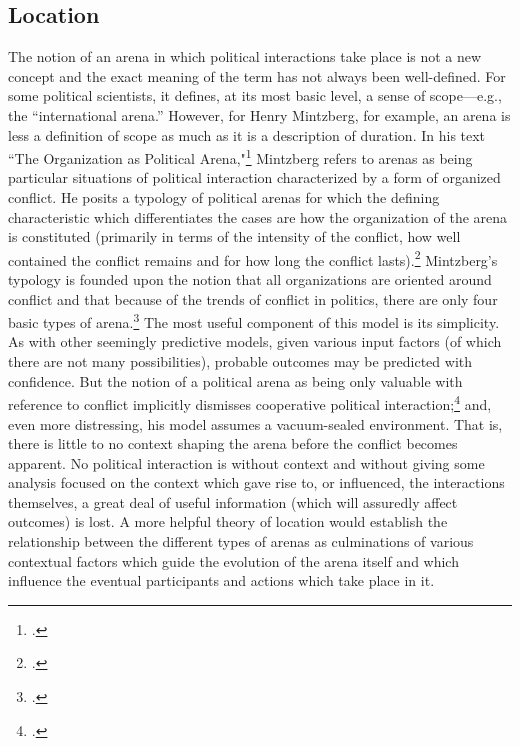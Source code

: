 \documentclass{article}
\begin{document}
\subsection{Location}
The notion of an arena in which political interactions take place is not a new concept and the exact meaning of the term has not always been well-defined. 
For some political scientists, it defines, at its most basic level, a sense of scope---e.g., the ``international arena.'' 
However, for Henry Mintzberg, for example, an arena is less a definition of scope as much as it is a description of duration. 
In his text ``The Organization as Political Arena,"\footcite{mintzberg85} Mintzberg refers to arenas as being particular situations of political interaction characterized by a form of organized conflict. 
He posits a typology of political arenas for which the defining characteristic which differentiates the cases are how the organization of the arena is constituted (primarily in terms of the intensity of the conflict, how well contained the conflict remains and for how long the conflict lasts).\footcite[141]{mintzberg85} 
Mintzberg's typology is founded upon the notion that all organizations are oriented around conflict and that because of the trends of conflict in politics, there are only four basic types of arena.\footcite[These four types are ``Confrontation,'' ``Shaky alliance,'' ``Politicized organization,'' and ``Complete Political Arena.'']{mintzberg85}
The most useful component of this model is its simplicity. 
As with other seemingly predictive models, given various input factors (of which there are not many possibilities), probable outcomes may be predicted with confidence. 
But the notion of a political arena as being only valuable with reference to conflict implicitly dismisses cooperative political interaction;\footcite[152]{mintzberg85} and, even more distressing, his model assumes a vacuum-sealed environment. 
That is, there is little to no context shaping the arena before the conflict becomes apparent. 
No political interaction is without context and without giving some analysis focused on the context which gave rise to, or influenced, the interactions themselves, a great deal of useful information (which will assuredly affect outcomes) is lost.
A more helpful theory of location would establish the relationship between the different types of arenas as culminations of various contextual factors which guide the evolution of the arena itself and which influence the eventual participants and actions which take place in it.
\end{document}
